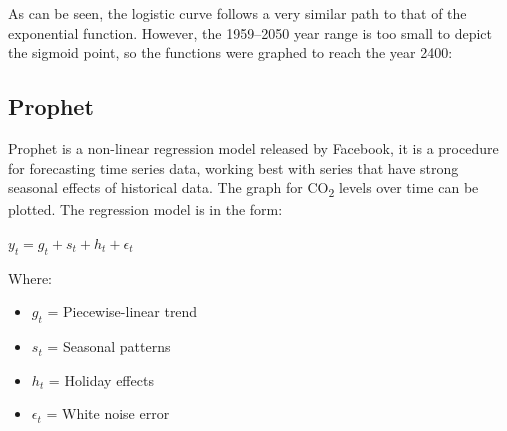 \documentclass[12pt]{mcmthesis}
\begin{document}
    As can be seen, the logistic curve follows a very similar path to that of the exponential function. However, the 1959--2050 year range is too small to depict the sigmoid point, so the functions were graphed to reach the year 2400:

    \begin{center}
    \end{center}

    \subsection{Prophet}
    Prophet is a non-linear regression model released by Facebook, it is a procedure for forecasting time series data, working best with series that have strong seasonal effects of historical data. The graph for CO\textsubscript{2} levels over time can be plotted. The regression model is in the form:

    ${\displaystyle y_t = g_t + s_t + h_t +\epsilon_t}$

    Where:
    \begin{itemize}
        \item ${g_t}$ = Piecewise-linear trend
        \item ${s_t}$ = Seasonal patterns
        \item ${h_t}$ = Holiday effects
        \item ${\epsilon_t}$ = White noise error
    \end{itemize}
\end{document}
